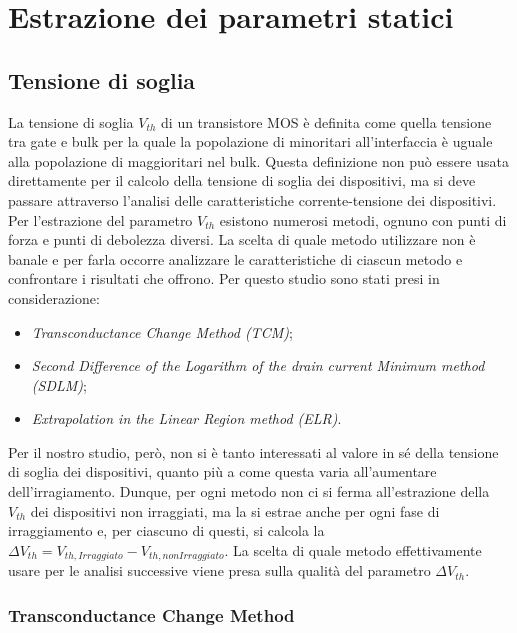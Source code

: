 \documentclass[12pt, letterpaper]{book}
\begin{document}
\chapter{Estrazione dei parametri statici}

\section{Tensione di soglia}

La tensione di soglia $V_{th}$ di un transistore MOS è definita come quella tensione tra gate e bulk per la quale la popolazione di minoritari all'interfaccia è uguale alla popolazione di maggioritari nel bulk. Questa definizione non può essere usata direttamente per il calcolo della tensione di soglia dei dispositivi, ma si deve passare attraverso l'analisi delle caratteristiche corrente-tensione dei dispositivi. \\
Per l'estrazione del parametro $V_{th}$ esistono numerosi metodi, ognuno con punti di forza e punti di debolezza diversi. La scelta di quale metodo utilizzare non è banale e per farla occorre analizzare le caratteristiche di ciascun metodo e confrontare i risultati che offrono. Per questo studio sono stati presi in considerazione:

\begin{itemize}
  \item \emph{Transconductance Change Method (TCM)};
  \item \emph{Second Difference of the Logarithm of the drain current Minimum method (SDLM)};
  \item \emph{Extrapolation in the Linear Region method (ELR)}.
\end{itemize}

Per il nostro studio, però, non si è tanto interessati al valore in sé della tensione di soglia dei dispositivi, quanto più a come questa varia all'aumentare dell'irragiamento. Dunque, per ogni metodo non ci si ferma all'estrazione della $V_{th}$ dei dispositivi non irraggiati, ma la si estrae anche per ogni fase di irraggiamento e, per ciascuno di questi, si calcola la $\Delta V_{th} = V_{th, Irraggiato}-V_{th, non Irraggiato}$. La scelta di quale metodo effettivamente usare per le analisi successive viene presa sulla qualità del parametro $\Delta V_{th}$.


\subsection{Transconductance Change Method}
\end{document}
